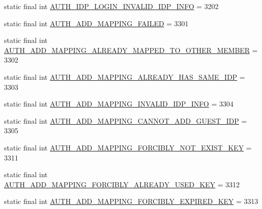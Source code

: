 \begin{DoxyCompactItemize}
\item 
static final int \hyperlink{classcom_1_1toast_1_1android_1_1gamebase_1_1base_1_1_gamebase_error_ad9705f588fccbb93aa85e0c6b0a9ca46}{A\+U\+T\+H\+\_\+\+I\+D\+P\+\_\+\+L\+O\+G\+I\+N\+\_\+\+I\+N\+V\+A\+L\+I\+D\+\_\+\+I\+D\+P\+\_\+\+I\+N\+FO} = 3202
\item 
static final int \hyperlink{classcom_1_1toast_1_1android_1_1gamebase_1_1base_1_1_gamebase_error_aa454a70f1941fc3d5ef4f6d6d9ce9764}{A\+U\+T\+H\+\_\+\+A\+D\+D\+\_\+\+M\+A\+P\+P\+I\+N\+G\+\_\+\+F\+A\+I\+L\+ED} = 3301
\item 
static final int \hyperlink{classcom_1_1toast_1_1android_1_1gamebase_1_1base_1_1_gamebase_error_a666b9ff84344649ceb8dfd19573e454f}{A\+U\+T\+H\+\_\+\+A\+D\+D\+\_\+\+M\+A\+P\+P\+I\+N\+G\+\_\+\+A\+L\+R\+E\+A\+D\+Y\+\_\+\+M\+A\+P\+P\+E\+D\+\_\+\+T\+O\+\_\+\+O\+T\+H\+E\+R\+\_\+\+M\+E\+M\+B\+ER} = 3302
\item 
static final int \hyperlink{classcom_1_1toast_1_1android_1_1gamebase_1_1base_1_1_gamebase_error_a84927f1b168239e1c6e4e06072d9f097}{A\+U\+T\+H\+\_\+\+A\+D\+D\+\_\+\+M\+A\+P\+P\+I\+N\+G\+\_\+\+A\+L\+R\+E\+A\+D\+Y\+\_\+\+H\+A\+S\+\_\+\+S\+A\+M\+E\+\_\+\+I\+DP} = 3303
\item 
static final int \hyperlink{classcom_1_1toast_1_1android_1_1gamebase_1_1base_1_1_gamebase_error_ab0b9adc67dd24e57bcdbe4b3c73432de}{A\+U\+T\+H\+\_\+\+A\+D\+D\+\_\+\+M\+A\+P\+P\+I\+N\+G\+\_\+\+I\+N\+V\+A\+L\+I\+D\+\_\+\+I\+D\+P\+\_\+\+I\+N\+FO} = 3304
\item 
static final int \hyperlink{classcom_1_1toast_1_1android_1_1gamebase_1_1base_1_1_gamebase_error_a3553979702d4ad952e9cacc24704c2eb}{A\+U\+T\+H\+\_\+\+A\+D\+D\+\_\+\+M\+A\+P\+P\+I\+N\+G\+\_\+\+C\+A\+N\+N\+O\+T\+\_\+\+A\+D\+D\+\_\+\+G\+U\+E\+S\+T\+\_\+\+I\+DP} = 3305
\item 
static final int \hyperlink{classcom_1_1toast_1_1android_1_1gamebase_1_1base_1_1_gamebase_error_a835dcf4848344f23161981f632149208}{A\+U\+T\+H\+\_\+\+A\+D\+D\+\_\+\+M\+A\+P\+P\+I\+N\+G\+\_\+\+F\+O\+R\+C\+I\+B\+L\+Y\+\_\+\+N\+O\+T\+\_\+\+E\+X\+I\+S\+T\+\_\+\+K\+EY} = 3311
\item 
static final int \hyperlink{classcom_1_1toast_1_1android_1_1gamebase_1_1base_1_1_gamebase_error_aa18ee2b60e83125a0422c5d56bd59b18}{A\+U\+T\+H\+\_\+\+A\+D\+D\+\_\+\+M\+A\+P\+P\+I\+N\+G\+\_\+\+F\+O\+R\+C\+I\+B\+L\+Y\+\_\+\+A\+L\+R\+E\+A\+D\+Y\+\_\+\+U\+S\+E\+D\+\_\+\+K\+EY} = 3312
\item 
static final int \hyperlink{classcom_1_1toast_1_1android_1_1gamebase_1_1base_1_1_gamebase_error_abd3a347ce8e5f5c41c6f284690d7b1dc}{A\+U\+T\+H\+\_\+\+A\+D\+D\+\_\+\+M\+A\+P\+P\+I\+N\+G\+\_\+\+F\+O\+R\+C\+I\+B\+L\+Y\+\_\+\+E\+X\+P\+I\+R\+E\+D\+\_\+\+K\+EY} = 3313

\end{DoxyCompactItemize}

